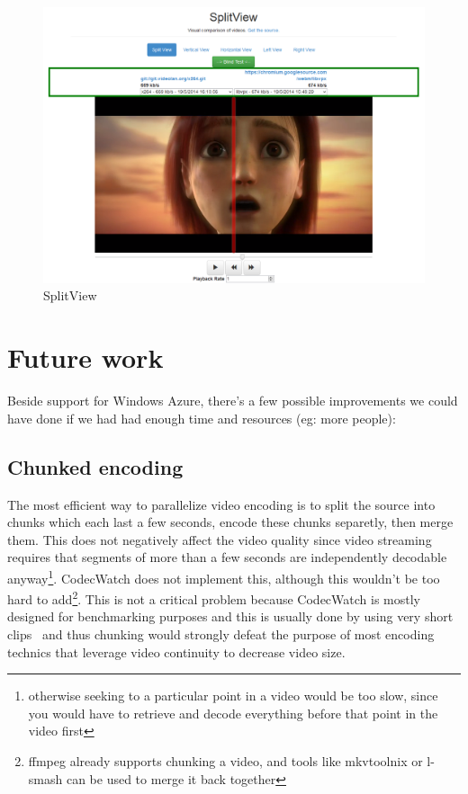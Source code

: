 \documentclass[a4paper,12pt]{article}
\begin{document}
\begin{figure}[!h] \centering
  \includegraphics[width=1\textwidth]{figures/split1.png}
  \caption{SplitView}
  \label{fig:split1}
\end{figure}

\section{Future work}
Beside support for Windows Azure, there's a few possible improvements we could
have done if we had had enough time and resources (eg: more people):
\subsection{Chunked encoding}
The most efficient way to parallelize video encoding is to split the source into
chunks which each last a few seconds, encode these chunks separetly, then merge
them. This does not negatively affect the video quality since video streaming
requires that segments of more than a few seconds are independently decodable
anyway\footnote{otherwise seeking to a particular point in a video would be too slow,
since you would have to retrieve and decode everything before that point in the
video first}. CodecWatch does not implement this, although this wouldn't be too
hard to add\footnote{ffmpeg already supports chunking a video, and tools like mkvtoolnix
or l-smash can be used to merge it back together}. This is not a critical
problem because CodecWatch is mostly designed for benchmarking purposes and this
is usually done by using very short clips~\cite{derf} and thus chunking would strongly defeat the purpose of most encoding technics that leverage video continuity to decrease video size.
\end{document}
